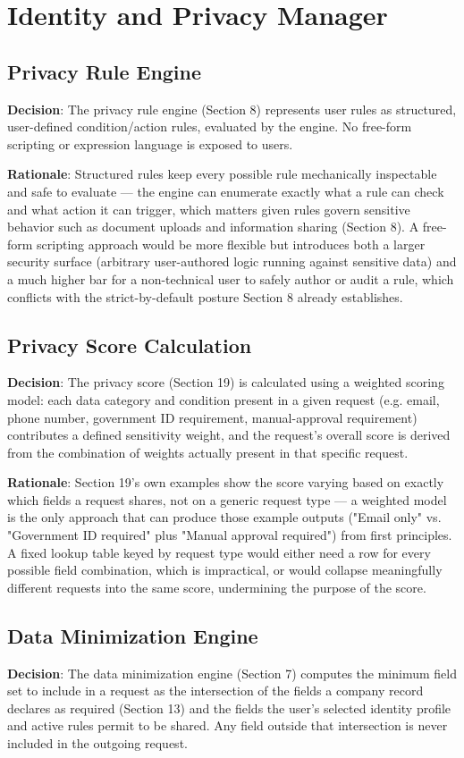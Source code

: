 \chapter{Identity and Privacy Manager}

\section{Privacy Rule Engine}
\textbf{Decision}: The privacy rule engine (Section 8) represents user rules as structured, user-defined condition/action rules, evaluated by the engine. No free-form scripting or expression language is exposed to users.

\textbf{Rationale}: Structured rules keep every possible rule mechanically inspectable and safe to evaluate — the engine can enumerate exactly what a rule can check and what action it can trigger, which matters given rules govern sensitive behavior such as document uploads and information sharing (Section 8). A free-form scripting approach would be more flexible but introduces both a larger security surface (arbitrary user-authored logic running against sensitive data) and a much higher bar for a non-technical user to safely author or audit a rule, which conflicts with the strict-by-default posture Section 8 already establishes.
\section{Privacy Score Calculation}
\textbf{Decision}: The privacy score (Section 19) is calculated using a weighted scoring model: each data category and condition present in a given request (e.g. email, phone number, government ID requirement, manual-approval requirement) contributes a defined sensitivity weight, and the request's overall score is derived from the combination of weights actually present in that specific request.

\textbf{Rationale}: Section 19's own examples show the score varying based on exactly which fields a request shares, not on a generic request type — a weighted model is the only approach that can produce those example outputs ("Email only" vs. "Government ID required" plus "Manual approval required") from first principles. A fixed lookup table keyed by request type would either need a row for every possible field combination, which is impractical, or would collapse meaningfully different requests into the same score, undermining the purpose of the score.
\section{Data Minimization Engine}
\textbf{Decision}: The data minimization engine (Section 7) computes the minimum field set to include in a request as the intersection of the fields a company record declares as required (Section 13) and the fields the user's selected identity profile and active rules permit to be shared. Any field outside that intersection is never included in the outgoing request.

